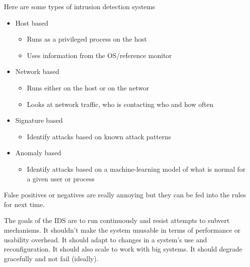 \documentclass[11pt,a4paper,titlepage,dvipsnames,cmyk]{scrartcl}
\begin{document}
Here are some types of intrusion detection systems
\begin{itemize}
    \item Host based
    \begin{itemize}
        \item Runs as a privileged process on the host
        \item Uses information from the OS/reference monitor
    \end{itemize}
    \item Network based
    \begin{itemize}
        \item Runs either on the host or on the networ
        \item Looks at network traffic, who is contacting who and how often
    \end{itemize}
    \item Signature based
    \begin{itemize}
        \item Identify attacks based on known attack patterns
    \end{itemize}
    \item Anomaly based
    \begin{itemize}
        \item Identify attacks based on a machine-learning model of what is normal for a given user or process
    \end{itemize}
\end{itemize}

False positives or negatives are really annoying but they can be fed into the rules for next time.

The goals of the IDS are to run continuously and resist attempts to subvert mechanisms. It shouldn't make the system unusable in terms of performance or usability overhead. It should adapt to changes in a system's use and reconfiguration. It should also scale to work with big systems. It should degrade gracefully and not fail (ideally).
\end{document}
